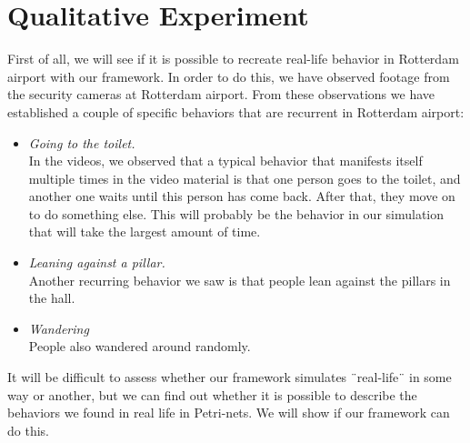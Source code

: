 \documentclass[11pt]{book}
\begin{document}

\section{Qualitative Experiment}
First of all, we will see if it is possible to recreate real-life behavior in Rotterdam airport with our framework. In order to do this, we have observed footage from the security cameras at Rotterdam airport. From these observations we have established a couple of specific behaviors that are recurrent in Rotterdam airport:

\begin{itemize}
\item \emph{Going to the toilet.}
\\In the videos, we observed that a typical behavior that manifests itself multiple times in the video material is that one person goes to the toilet, and another one waits until this person has come back. After that, they move on to do something else. This will probably be the behavior in our simulation that will take the largest amount of time.

\item \emph{Leaning against a pillar.}
\\Another recurring behavior we saw is that people lean against the pillars in the hall. 

\item \emph{Wandering}\\
People also wandered around randomly.
\end{itemize}

It will be difficult to assess whether our framework simulates ¨real-life¨ in some way or another, but we can find out whether it is possible to describe the behaviors we found in real life in Petri-nets. We will show if our framework can do this.

\end{document}
